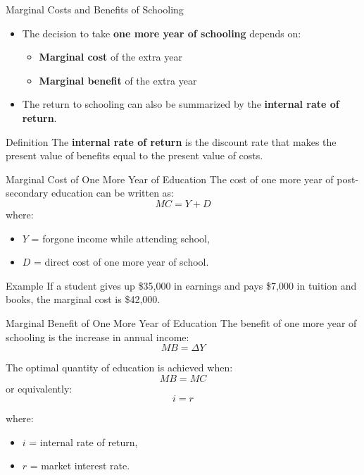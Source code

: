 \documentclass[aspectratio=169]{beamer}
\begin{document}
\begin{frame}{Marginal Costs and Benefits of Schooling}
\transfade
\begin{itemize}[<+->]
  \item The decision to take \textbf{one more year of schooling} depends on:
  \begin{itemize}[<+->]
    \item \textbf{Marginal cost} of the extra year
    \item \textbf{Marginal benefit} of the extra year
  \end{itemize}
  \item The return to schooling can also be summarized by the \textbf{internal rate of return}.
\end{itemize}

\begin{block}{Definition}
The \textbf{internal rate of return} is the discount rate that makes the present value of benefits equal to the present value of costs.
\end{block}
\end{frame}

\begin{frame}{Marginal Cost of One More Year of Education}
\transfade
The cost of one more year of post-secondary education can be written as:
\[
MC = Y + D
\]
where:
\begin{itemize}[<+->]
  \item \(Y\) = forgone income while attending school,
  \item \(D\) = direct cost of one more year of school.
\end{itemize}

\begin{exampleblock}{Example}
If a student gives up \$35,000 in earnings and pays \$7,000 in tuition and books, the marginal cost is \$42,000.
\end{exampleblock}
\end{frame}

\begin{frame}{Marginal Benefit of One More Year of Education}
\transfade
The benefit of one more year of schooling is the increase in annual income:
\[
MB = \Delta Y
\]

The optimal quantity of education is achieved when:
\[
MB = MC
\]
or equivalently:
\[
i = r
\]

where:
\begin{itemize}[<+->]
  \item \(i\) = internal rate of return,
  \item \(r\) = market interest rate.
\end{itemize}
\end{frame}
\end{document}
